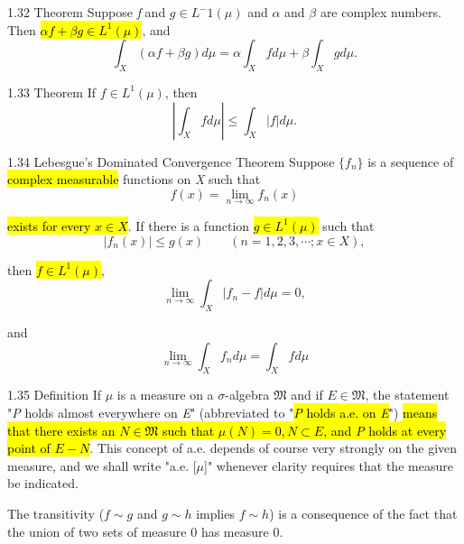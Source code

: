 \documentclass{article}
\begin{document}
\begin{theo}{1.32 Theorem}
Suppose \textit{f} and $g\in L^-1(\mu)$ and $\alpha$ and $\beta$ are complex numbers. Then \hl{$\alpha f+\beta g\in L^1(\mu)$}, and
\begin{displaymath}
  \int_X(\alpha f+\beta g)d\mu=\alpha\int_X fd\mu+\beta\int_X gd\mu.
\end{displaymath}
	
\end{theo}

\begin{theo}{1.33 Theorem}
If $f\in L^1(\mu)$, then
\begin{displaymath}
  |\int_X fd\mu|\le\int_X|f|d\mu.
\end{displaymath}
	
\end{theo}

\begin{theo}{1.34 Lebesgue's Dominated Convergence Theorem}
Suppose $\{f_n\}$ is a sequence of \hl{complex measurable} functions on \textit{X} such that
\begin{displaymath}
  f(x)=\lim_{n\rightarrow\infty}f_n(x)
\end{displaymath}

\hl{exists for every $x\in X$}. If there is a function \hl{$g\in L^1(\mu)$} such that
\begin{displaymath}
  |f_n(x)|\le g(x)\qquad (n=1,2,3,\cdots;x\in X),
\end{displaymath}

then \hl{$f\in L^1(\mu)$},
\begin{displaymath}
  \lim_{n\rightarrow\infty}\int_X|f_n-f|d\mu=0,
\end{displaymath}

and
\begin{displaymath}
  \lim_{n\rightarrow\infty}\int_X f_nd\mu=\int_X fd\mu
\end{displaymath}


\end{theo}

\begin{defi}{1.35 Definition}
If $\mu$ is a measure on a $\sigma$-algebra $\mathfrak{M}$ and if $E\in\mathfrak{M}$, the statement "\textit{P} holds almost everywhere on \textit{E}" (abbreviated to "\hl{\textit{P} holds a.e. on \textit{E}}")	\hl{means that there exists an $N\in\mathfrak{M}$ such that $\mu(N)=0, N\subset E$, and \textit{P} holds at every point of $E-N$}. This concept of a.e. depends of course very strongly on the given measure, and we shall write "a.e. [$\mu$]" whenever clarity requires that the measure be indicated.

\vspace{0.2cm}

The transitivity ($f\sim g$ and $g\sim h$ implies $f\sim h$) is a consequence of the fact that the union of two sets of measure 0 has measure 0.
\end{defi}
\end{document}
